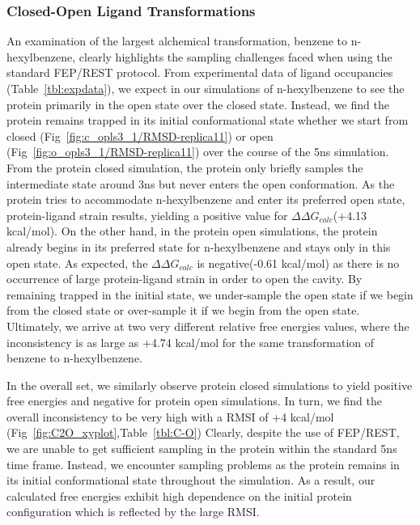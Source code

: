 \documentclass[journal=jctcce,manuscript=article]{achemso}
\begin{document}
\subsubsection*{Closed-Open Ligand Transformations}
An examination of the largest alchemical transformation, benzene to n-hexylbenzene, clearly highlights the sampling challenges faced when using the standard FEP/REST protocol.
From experimental data of ligand occupancies (Table~\ref{tbl:expdata}), we expect in our simulations of n-hexylbenzene to see the protein primarily in the open state over the closed state.
Instead, we find the protein remains trapped in its initial conformational state whether we start from closed (Fig~\ref{fig:c_opls3_1/RMSD-replica11}) or open (Fig~\ref{fig:o_opls3_1/RMSD-replica11}) over the course of the 5ns simulation.
From the protein closed simulation, the protein only briefly samples the intermediate state around 3ns but never enters the open conformation.
As the protein tries to accommodate n-hexylbenzene and enter its preferred open state, protein-ligand strain results, yielding a positive value for $\Delta\Delta G_{calc}$(+4.13 kcal/mol).
On the other hand, in the protein open simulations, the protein already begins in its preferred state for n-hexylbenzene and stays only in this open state.
As expected, the $\Delta\Delta G_{calc}$ is negative(-0.61 kcal/mol) as there is no occurrence of large protein-ligand strain in order to open the cavity.
By remaining trapped in the initial state, we under-sample the open state if we begin from the closed state or over-sample it if we begin from the open state.
Ultimately, we arrive at two very different relative free energies values, where the inconsistency is as large as +4.74 kcal/mol for the same transformation of benzene to n-hexylbenzene.

In the overall set, we similarly observe protein closed simulations to yield positive free energies and negative for protein open simulations. 
In turn, we find the overall inconsistency to be very high with a RMSI of +4 kcal/mol (Fig~\ref{fig:C2O_xyplot},Table~\ref{tbl:C-O}) 
Clearly, despite the use of FEP/REST, we are unable to get sufficient sampling in the protein within the standard 5ns time frame.
Instead, we encounter sampling problems as the protein remains in its initial conformational state throughout the simulation. 
As a result, our calculated free energies exhibit high dependence on the initial protein configuration which is reflected by the large RMSI.
\end{document}
